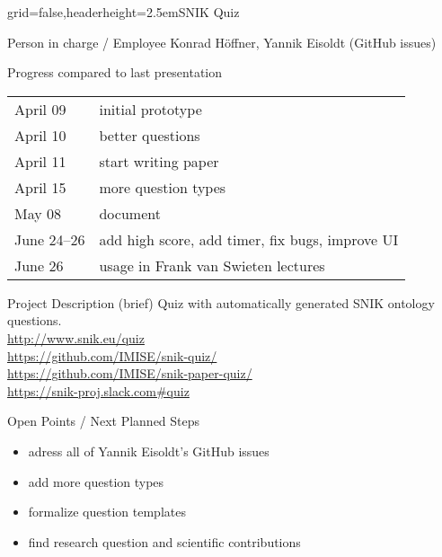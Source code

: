 \documentclass[]{kiesgrube}
\begin{document}
\begin{poster}%
{grid=false,headerheight=2.5em}{}{SNIK Quiz}{}

\begin{posterbox}[name=person,column=0,row=0]{Person in charge / Employee}
Konrad Höffner, Yannik Eisoldt (GitHub issues) 
\end{posterbox}
\begin{posterbox}[name=progress,below=person]{Progress compared to last presentation}
\begin{tabular}{ll}
April 09	&initial prototype\\
April 10	&better questions\\
April 11	&start writing paper\\
April 15	&more question types\\
May 08		&document\\
June 24--26	&add high score, add timer, fix bugs, improve UI\\
June 26		&usage in Frank van Swieten lectures\\
\end{tabular}
\end{posterbox}
\begin{posterbox}[name=description,below=progress]{Project Description (brief)}
Quiz with automatically generated SNIK ontology questions.\\
\url{http://www.snik.eu/quiz}\\
\url{https://github.com/IMISE/snik-quiz/}\\
\url{https://github.com/IMISE/snik-paper-quiz/}\\
\url{https://snik-proj.slack.com#quiz}
\end{posterbox}
\begin{posterbox}[name=open,column=1,row=0]{Open Points / Next Planned Steps}
\begin{itemize}
\item adress all of Yannik Eisoldt's GitHub issues
\item add more question types
\item formalize question templates
\item find research question and scientific contributions

\end{itemize}
\end{posterbox}
\end{poster}
\end{document}

